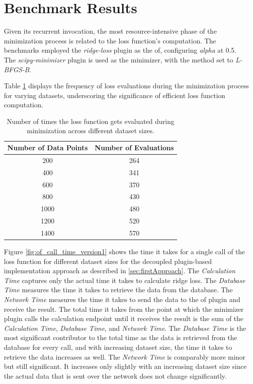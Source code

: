 \documentclass[
  a4paper,  %
  twoside,  %
  bibliography=totoc,
  headsepline,
  cleardoublepage=empty,
  parskip=half,
  draft=false
]{scrbook}
\begin{document}
\section{Benchmark Results}
\label{subsec:benchmarkingResults}

Given its recurrent invocation, the most resource-intensive phase of the minimization process is related to the loss function's computation.
The benchmarks employed the \emph{ridge-loss} plugin as the \gls{of}, configuring \emph{alpha} at 0.5.
The \emph{scipy-minimizer} plugin is used as the minimizer, with the method set to \emph{L-BFGS-B}.

Table \ref{table:of_calls} displays the frequency of loss evaluations during the minimization process for varying datasets, underscoring the significance of efficient loss function computation.

\begin{table}[h!]
  \centering
  \begin{tabular}{cc}
  \toprule
  \textbf{Number of Data Points} & \textbf{Number of Evaluations} \\
  \midrule
  200 & 264 \\
  400 & 341 \\
  600 & 370 \\
  800 & 430 \\
  1000 & 480 \\
  1200 & 520 \\
  1400 & 570 \\
  \bottomrule
  \end{tabular}
  \caption{Number of times the loss function gets evaluated during minimization across different dataset sizes.}
  \label{table:of_calls}
\end{table}

Figure \ref{fig:of_call_time_version1} shows the time it takes for a single call of the loss function for different dataset sizes for the decoupled plugin-based implementation approach as described in \ref{sec:firstApproach}.
The \emph{Calculation Time} captures only the actual time it takes to calculate ridge loss.
The \emph{Database Time} measures the time it takes to retrieve the data from the database.
The \emph{Network Time} measures the time it takes to send the data to the \gls{of} plugin and receive the result.
The total time it takes from the point at which the minimizer plugin calls the calculation endpoint until it receives the result is the sum of the \emph{Calculation Time}, \emph{Database Time}, and \emph{Network Time}.
The \emph{Database Time} is the most significant contributor to the total time as the data is retrieved from the database for every call, and with increasing dataset size, the time it takes to retrieve the data increases as well.
The \emph{Network Time} is comparably more minor but still significant. It increases only slightly with an increasing dataset size since the actual data that is sent over the network does not change significantly.
\end{document}
